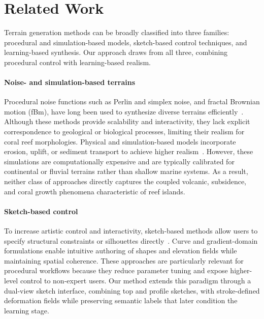 
\section{Related Work}

Terrain generation methods can be broadly classified into three families: procedural and simulation-based models, sketch-based control techniques, and learning-based synthesis. Our approach draws from all three, combining procedural control with learning-based realism.

\paragraph{Noise- and simulation-based terrains}
Procedural noise functions such as Perlin and simplex noise, and fractal Brownian motion (fBm), have long been used to synthesize diverse terrains efficiently~\cite{Perlin1985,Perlin2001,Musgrave1989,Ebert2003,Reinhard2010}. Although these methods provide scalability and interactivity, they lack explicit correspondence to geological or biological processes, limiting their realism for coral reef morphologies.  
Physical and simulation-based models incorporate erosion, uplift, or sediment transport to achieve higher realism~\cite{Benes2006,Mei2007,Neidhold2005,Cordonnier2016,Cordonnier2017a,Schott2023}. However, these simulations are computationally expensive and are typically calibrated for continental or fluvial terrains rather than shallow marine systems. As a result, neither class of approaches directly captures the coupled volcanic, subsidence, and coral growth phenomena characteristic of reef islands.

\paragraph{Sketch-based control}
To increase artistic control and interactivity, sketch-based methods allow users to specify structural constraints or silhouettes directly~\cite{Gain2009,Hnaidi2010,Tasse2014,Gasch2020,Talgorn2018,Guerin2022}. Curve and gradient-domain formulations enable intuitive authoring of shapes and elevation fields while maintaining spatial coherence. These approaches are particularly relevant for procedural workflows because they reduce parameter tuning and expose higher-level control to non-expert users.  
Our method extends this paradigm through a dual-view sketch interface, combining top and profile sketches, with stroke-defined deformation fields while preserving semantic labels that later condition the learning stage.

